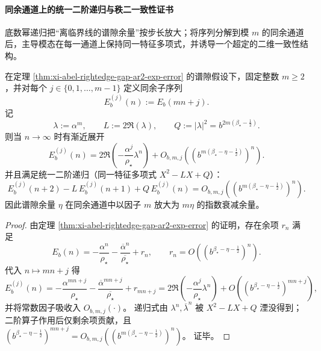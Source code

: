 \paragraph{同余通道上的统一二阶递归与秩二一致性证书}
底数幂递归把“离临界线的谱隙余量”按步长放大；将序列分解到模 \(m\) 的同余通道后，主导模态在每一通道上保持同一特征多项式，并诱导一个超定的二维一致性结构。

\begin{corollary}[同余子序列的统一二阶递归与谱隙余量放大]\label{cor:xi-rightedge-gap-congruence-ar2-amplification}
在定理 \ref{thm:xi-abel-rightedge-gap-ar2-exp-error} 的谱隙假设下，固定整数 \(m\ge 2\)，并对每个 \(j\in\{0,1,\dots,m-1\}\) 定义同余子序列
\[
E_b^{(j)}(n):=E_b(mn+j).
\]
记
\[
\lambda:=\alpha^m,\qquad L:=2\Re(\lambda),\qquad Q:=|\lambda|^2=b^{2m(\beta_\star-\frac12)}.
\]
则当 \(n\to\infty\) 时有渐近展开
\[
\boxed{\;
E_b^{(j)}(n)
=2\Re\!\left(-\frac{\alpha^{j}}{\rho_\star}\lambda^{n}\right)
+O_{b,m,j}\!\left(\left(b^{m(\beta_\star-\eta-\frac12)}\right)^{n}\right).\;}
\]
并且满足统一二阶递归（同一特征多项式 \(X^2-LX+Q\)）：
\[
\boxed{\;
E_b^{(j)}(n+2)-L\,E_b^{(j)}(n+1)+Q\,E_b^{(j)}(n)
=O_{b,m,j}\!\left(\left(b^{m(\beta_\star-\eta-\frac12)}\right)^{n}\right).\;}
\]
因此谱隙余量 \(\eta\) 在同余通道中以因子 \(m\) 放大为 \(m\eta\) 的指数衰减余量。
\end{corollary}

\begin{proof}
由定理 \ref{thm:xi-abel-rightedge-gap-ar2-exp-error} 的证明，存在余项 \(r_n\) 满足
\[
E_b(n)=-\frac{\alpha^n}{\rho_\star}-\frac{\overline{\alpha}^n}{\overline{\rho_\star}}+r_n,
\qquad
r_n=O\!\left(\left(b^{\beta_\star-\eta-\frac12}\right)^n\right).
\]
代入 \(n\mapsto mn+j\) 得
\[
E_b^{(j)}(n)
=-\frac{\alpha^{mn+j}}{\rho_\star}-\frac{\overline{\alpha}^{mn+j}}{\overline{\rho_\star}}+r_{mn+j}
=2\Re\!\left(-\frac{\alpha^j}{\rho_\star}\lambda^n\right)+O\!\left(\left(b^{\beta_\star-\eta-\frac12}\right)^{mn+j}\right),
\]
并将常数因子吸收入 \(O_{b,m,j}(\cdot)\)。
递归式由 \(\lambda^n,\overline{\lambda}^n\) 被 \(X^2-LX+Q\) 湮没得到；二阶算子作用后仅剩余项贡献，且
\(
\left(b^{\beta_\star-\eta-\frac12}\right)^{mn+j}
=O_{b,m,j}\left(\left(b^{m(\beta_\star-\eta-\frac12)}\right)^n\right)
\)。
证毕。
\end{proof}


